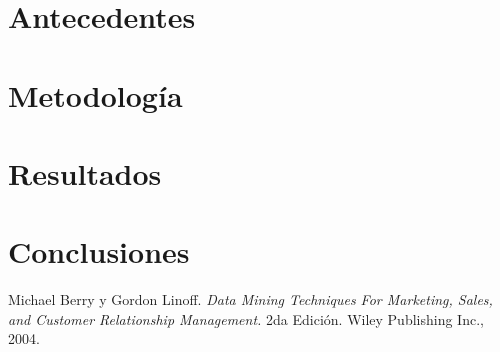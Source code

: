 \documentclass[letterpaper,11pt]{article}
\begin{document}
\section{Antecedentes}
\section{Metodología}
\section{Resultados}
\section{Conclusiones}

\begin{thebibliography}{10}
     Michael Berry y Gordon Linoff. {\em Data Mining Techniques For Marketing, Sales, and Customer Relationship Management.} 
        2da Edición. Wiley Publishing Inc., 2004. 
\end{thebibliography}
\end{document}

